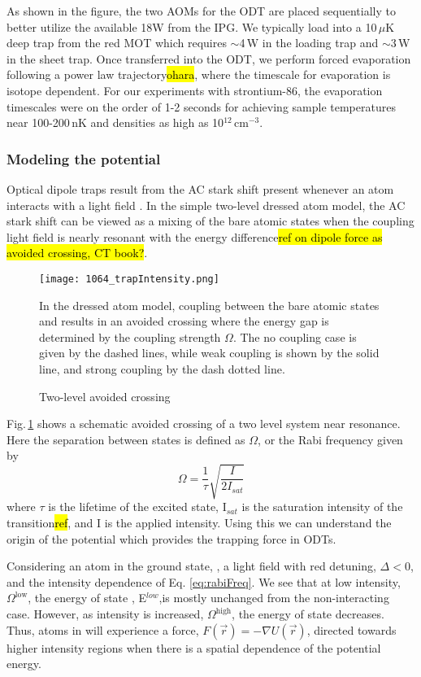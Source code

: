As shown in the figure, the two AOMs for the ODT are placed sequentially to better utilize the available 18W from the IPG.
We typically load into a 10\,$\mu$K deep trap from the red MOT which requires $\sim$4\,W in the loading trap and $\sim$3\,W in the sheet trap.
Once transferred into the ODT, we perform forced evaporation following a power law trajectory\hl{ohara}, where the timescale for evaporation is isotope dependent.
For our experiments with strontium-86, the evaporation timescales were on the order of 1-2 seconds for achieving sample temperatures near 100-200\,nK and densities as high as 10$^{12}$\,cm$^{-3}$.

\subsubsection{Modeling the potential} \label{sssec:1064_modeling}
Optical dipole traps result from the AC stark shift present whenever an atom interacts with a light field \cite{Grimm1999a}.
In the simple two-level dressed atom model, the AC stark shift can be viewed as a mixing of the bare atomic states when the coupling light field is nearly resonant with the energy difference\hl{ref on dipole force as avoided crossing, CT book?}.
	\begin{figure} 
		\centerline{
		\texttt{[image: 1064\_trapIntensity.png]}}
		\caption{Two-level avoided crossing}{In the dressed atom model, coupling between the bare atomic states  and  results in an avoided crossing where the energy gap is determined by the coupling strength $\Omega$. The no coupling case is given by the dashed lines, while weak coupling is shown by the solid line, and strong coupling by the dash dotted line.}
		\label{fig:avoidedCrossing}
	\end{figure}
Fig.\,\ref{fig:avoidedCrossing} shows a schematic avoided crossing of a two level system near resonance.
Here the separation between states is defined as $\Omega$, or the Rabi frequency given by
\begin{equation}
	\Omega = \frac{1}{\tau} \sqrt{\frac{I}{2I_{sat}}}
	\label{eq:rabiFreq}
\end{equation}
where $\tau$ is the lifetime of the excited state, I$_{sat}$ is the saturation intensity of the transition\hl{ref}, and I is the applied intensity.
Using this we can understand the origin of the potential which provides the trapping force in ODTs.

Considering an atom in the ground state, , a light field with red detuning, $\Delta < 0$, and the intensity dependence of Eq. \ref{eq:rabiFreq}.
We see that at low intensity, $\Omega^{\text{low}}$, the energy of state , E$^{low}$,is mostly unchanged from the non-interacting case.
However, as intensity is increased, $\Omega^{\text{high}}$, the energy of state  decreases. 
Thus, atoms in  will experience a force, $F(\vec{r}) = -\nabla U(\vec{r})$, directed towards higher intensity regions when there is a spatial dependence of the potential energy.

